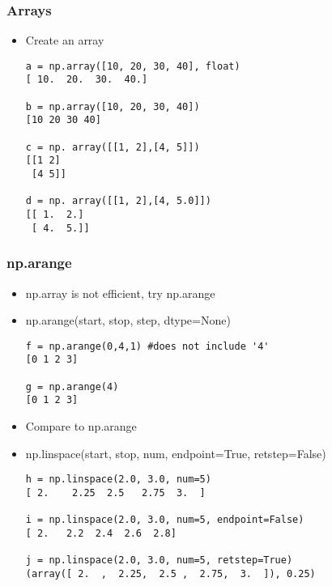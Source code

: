 \documentclass{beamer}
\begin{document}
\begin{frame}[fragile]
\frametitle{Arrays}
\begin{itemize}
\item Create an array
\begin{lstlisting}
a = np.array([10, 20, 30, 40], float)
[ 10.  20.  30.  40.]

b = np.array([10, 20, 30, 40])
[10 20 30 40]

c = np. array([[1, 2],[4, 5]])
[[1 2]
 [4 5]]

d = np. array([[1, 2],[4, 5.0]])
[[ 1.  2.]
 [ 4.  5.]]
\end{lstlisting}
\end{itemize}
\end{frame}

\begin{frame}[fragile]
\frametitle{np.arange}
\begin{itemize}
\item np.array is not efficient, try np.arange
\item np.arange(start, stop, step, dtype=None)
\begin{lstlisting}
f = np.arange(0,4,1) #does not include '4'
[0 1 2 3]

g = np.arange(4)
[0 1 2 3]
\end{lstlisting}
\end{itemize}
\end{frame}

\begin{frame}[fragile]
\begin{itemize}
\frametitle{np.linespace}
\item Compare to np.arange
\item np.linspace(start, stop, num, endpoint=True, retstep=False)
\begin{lstlisting}
h = np.linspace(2.0, 3.0, num=5)
[ 2.    2.25  2.5   2.75  3.  ]

i = np.linspace(2.0, 3.0, num=5, endpoint=False)
[ 2.   2.2  2.4  2.6  2.8]

j = np.linspace(2.0, 3.0, num=5, retstep=True)
(array([ 2.  ,  2.25,  2.5 ,  2.75,  3.  ]), 0.25)
\end{lstlisting}
\end{itemize}
\end{frame}
\end{document}
